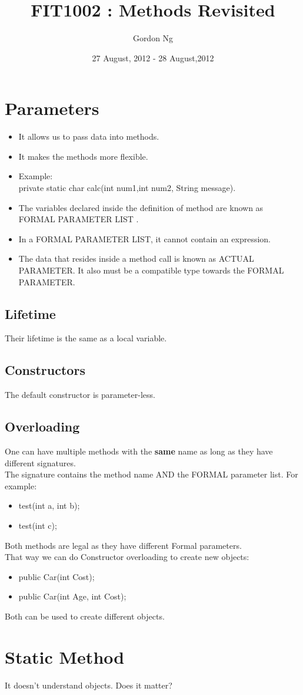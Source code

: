 \documentclass[12pt]{article}
\begin{document}
\title{FIT1002 : Methods Revisited}
\date{27 August, 2012 - 28 August,2012 }
\author{Gordon Ng}
\maketitle
\pagebreak
\tableofcontents
\pagebreak

\section{Parameters}
\begin{itemize}
\item It allows us to pass data into methods.
\item It makes the methods more flexible.
\item Example:\\
 private static char calc(int num1,int num2, String message).
\item The variables declared inside the definition of method are known as FORMAL PARAMETER LIST .
\item In a FORMAL PARAMETER LIST, it cannot contain an expression.
\item The data that resides inside a method call is known as ACTUAL PARAMETER. It also must be a compatible type towards the FORMAL PARAMETER.
\end{itemize}
\subsection{Lifetime}
Their lifetime is the same as a local variable.

\subsection{Constructors}
The default constructor is parameter-less.

\pagebreak
\subsection{Overloading}
One can have multiple methods with the \textbf{same} name as long as they have different signatures. \\
The signature contains the method name AND the FORMAL parameter list.
For example:
\begin{itemize}
\item test(int a, int b);
\item test(int c);
\end{itemize}
Both methods are legal as they have different Formal parameters. \\
That way we can do Constructor overloading to create new objects:
\begin{itemize}
\item public Car(int Cost);
\item public Car(int Age, int Cost);
\end{itemize}
Both can be used to create different objects.

\section{Static Method}
It doesn't understand objects. Does it matter?
\end{document}

